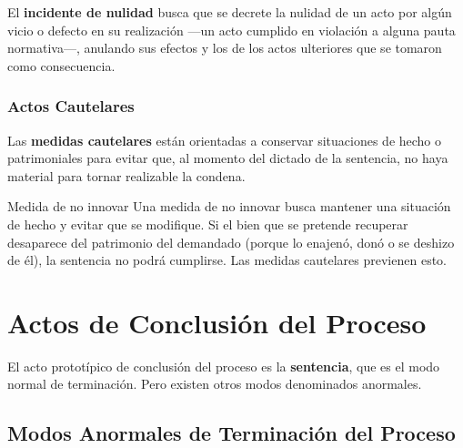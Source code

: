 \documentclass[12pt,oneside]{book}
\begin{document}
El \textbf{incidente de nulidad} busca que se decrete la nulidad de un acto por algún vicio o defecto en su realización ---un acto cumplido en violación a alguna pauta normativa---, anulando sus efectos y los de los actos ulteriores que se tomaron como consecuencia.

\subsubsection{Actos Cautelares}

Las \textbf{medidas cautelares} están orientadas a conservar situaciones de hecho o patrimoniales para evitar que, al momento del dictado de la sentencia, no haya material para tornar realizable la condena.

\begin{example}{Medida de no innovar}
Una medida de no innovar busca mantener una situación de hecho y evitar que se modifique. Si el bien que se pretende recuperar desaparece del patrimonio del demandado (porque lo enajenó, donó o se deshizo de él), la sentencia no podrá cumplirse. Las medidas cautelares previenen esto.
\end{example}

\section{Actos de Conclusión del Proceso}

El acto prototípico de conclusión del proceso es la \textbf{sentencia}, que es el modo normal de terminación. Pero existen otros modos denominados anormales.

\subsection{Modos Anormales de Terminación del Proceso}
\end{document}
